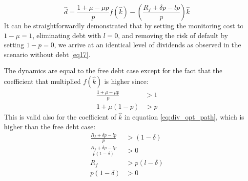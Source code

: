 \documentclass[12pt]{article}
\begin{document}
\begin{equation}
    \widehat{d} =\frac{1+\mu-\mu p}{p}f(\hat{k})-\left(\frac{R_f+\delta p - l p}{p}\right)\hat{k} \label{eq:div_opt_path}
\end{equation}
It can be straightforwardly demonstrated that by setting the monitoring cost to \(1-\mu=1\), eliminating debt
with \(l=0\), and removing the risk of default by setting \(1-p=0\), we arrive at an identical level of dividends as
observed in the scenario without debt \ref{eq17}. 

The dynamics are equal to the free debt case except for the fact that the coefficient that multiplied \(f(\hat{k})\) is
higher since:
\begin{align*}
    \frac{1+\mu-\mu p}{p}&>1 \\
    1+\mu(1- p) &> p
\end{align*}
This is valid also for the coefficient of \(\hat{k}\) in equation \ref{eq:div_opt_path}, which is higher than the free
debt case:
\begin{align*}
    \frac{R_f+\delta p - l p}{p}&>(1-\delta) \\
    \frac{R_f+\delta p - l p}{p(1-\delta)}&>0 \\
    R_f &> p(l-\delta)\\
    p(1-\delta)&>0
\end{align*}
\end{document}
